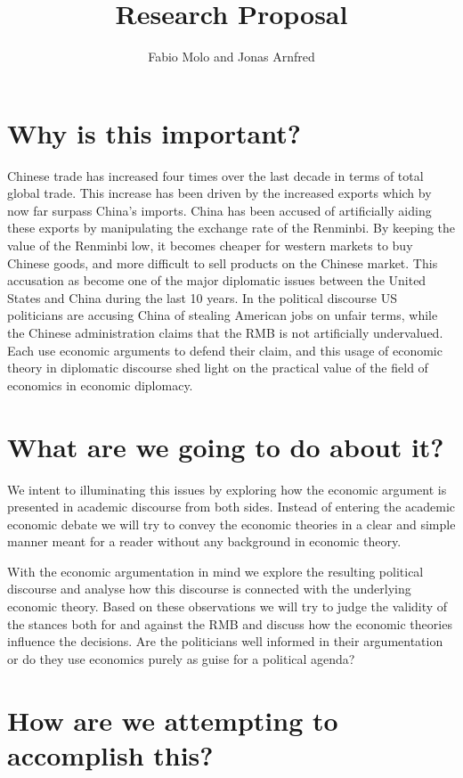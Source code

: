 \documentclass[11pt]{article}
\title{Research Proposal}
\author{Fabio Molo and Jonas Arnfred}
\begin{document}
\maketitle

\section{Why is this important?}

Chinese trade has increased four times over the last decade in terms of 
total global trade. This increase has been driven by the increased 
exports which by now far surpass China's imports.
China has been accused of artificially aiding these exports by 
manipulating the exchange rate of the Renminbi. By keeping the value of 
the Renminbi low, it becomes cheaper for western markets to buy Chinese 
goods, and more difficult to sell products on the Chinese market.
This accusation as become one of the major diplomatic issues between the 
United States and China during the last 10 years. In the political 
discourse US politicians are accusing China of stealing American jobs on 
unfair terms, while the Chinese administration claims that the RMB is 
not artificially undervalued.  Each use economic arguments to defend 
their claim, and this usage of economic theory in diplomatic discourse 
shed light on the practical value of the field of economics in economic 
diplomacy.

\section{What are we going to do about it?}

We intent to illuminating this issues by exploring how the economic 
argument is presented in academic discourse from both sides. Instead of 
entering the academic economic debate we will try to convey the economic 
theories in a clear and simple manner meant for a reader without any 
background in economic theory.  

With the economic argumentation in mind we explore the resulting 
political discourse and analyse how this discourse is connected with the 
underlying economic theory.  Based on these observations we will try to 
judge the validity of the stances both for and against the RMB and 
discuss how the economic theories influence the decisions. Are the 
politicians well informed in their argumentation or do they use 
economics purely as guise for a political agenda?

\section{How are we attempting to accomplish this?}
\end{document}
